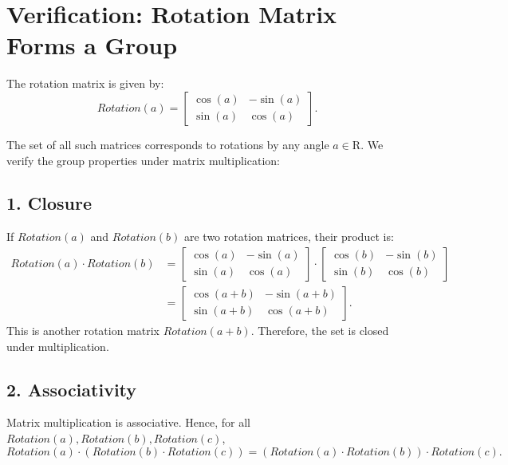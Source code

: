 \documentclass{article}
\begin{document}
\section*{Verification: Rotation Matrix Forms a Group}

The rotation matrix is given by:
\begin{equation}
Rotation(a) = \begin{bmatrix}
\cos(a) & -\sin(a) \\
\sin(a) & \cos(a)
\end{bmatrix}.
\end{equation}

The set of all such matrices corresponds to rotations by any angle  \(a \in \mathrm{R}\). We verify the group properties under matrix multiplication:


\subsection*{1. Closure}
If \( Rotation(a) \) and \( Rotation(b) \) are two rotation matrices, their product is:
\begin{align*}
Rotation(a) \cdot Rotation(b) &= \begin{bmatrix}
\cos(a) & -\sin(a) \\
\sin(a) & \cos(a)
\end{bmatrix}
\cdot
\begin{bmatrix}
\cos(b) & -\sin(b) \\
\sin(b) & \cos(b)
\end{bmatrix} \\
&= \begin{bmatrix}
\cos(a+b) & -\sin(a+b) \\
\sin(a+b) & \cos(a+b)
\end{bmatrix}.
\end{align*}
This is another rotation matrix \( Rotation(a+b) \). Therefore, the set is closed under multiplication.

\subsection*{2. Associativity}
Matrix multiplication is associative. Hence, for all \( Rotation(a), Rotation(b), Rotation(c) \),
\begin{equation}
Rotation(a) \cdot (Rotation(b) \cdot Rotation(c)) = (Rotation(a) \cdot Rotation(b)) \cdot Rotation(c).
\end{equation}
\end{document}
